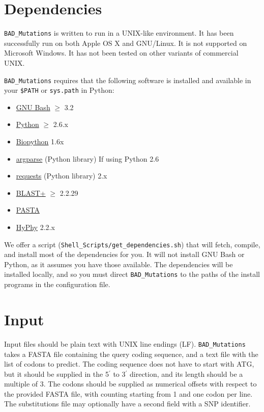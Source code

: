 \documentclass[12pt]{article}
\newcommand{\BM}{\texttt{BAD\_Mutations} }
\begin{document}
\section*{Dependencies}
\par \BM is written to run in a UNIX-like environment. It has been successfully
run on both Apple OS X and GNU/Linux. It is not supported on Microsoft Windows.
It has not been tested on other variants of commercial UNIX.

\par \BM requires that the following software is installed and
available in your \texttt{\$PATH} or \texttt{sys.path} in Python:
\begin{itemize}[noitemsep]
    \item \href{https://www.gnu.org/software/bash/}{GNU Bash} $\geq$ 3.2
    \item \href{https://www.python.org/}{Python} $\geq$ 2.6.x
    \item \href{http://biopython.org/}{Biopython} 1.6x
    \item \href{https://code.google.com/p/argparse/}{argparse} (Python library) If using Python 2.6
    \item \href{http://docs.python-requests.org/en/latest/}{requests} (Python library) 2.x
    \item \href{https://blast.ncbi.nlm.nih.gov/Blast.cgi?PAGE_TYPE=BlastDocs&DOC_TYPE=Download}{BLAST+} $\geq$ 2.2.29
    \item \href{http://www.cs.utexas.edu/~phylo/software/pasta/}{PASTA}
    \item \href{http://hyphy.org/}{HyPhy} 2.2.x
\end{itemize}

\par We offer a script (\texttt{Shell\_Scripts/get\_dependencies.sh}) that will
fetch, compile, and install most of the dependencies for you. It will not
install GNU Bash or Python, as it assumes you have those available. The
dependencies will be installed locally, and so you must direct \BM to the paths
of the install programs in the configuration file.

\section*{Input}
\par Input files should be plain text with UNIX line endings (LF). \BM takes a
FASTA file containing the query coding sequence, and a text file with the list
of codons to predict. The coding sequence does not have to start with ATG, but
it should be supplied in the 5$^{\prime}$ to 3$^{\prime}$ direction, and its
length should be a multiple of 3. The codons should be supplied as numerical
offsets with respect to the provided FASTA file, with counting starting from 1
and one codon per line. The substitutions file may optionally have a second
field with a SNP identifier.
\end{document}
